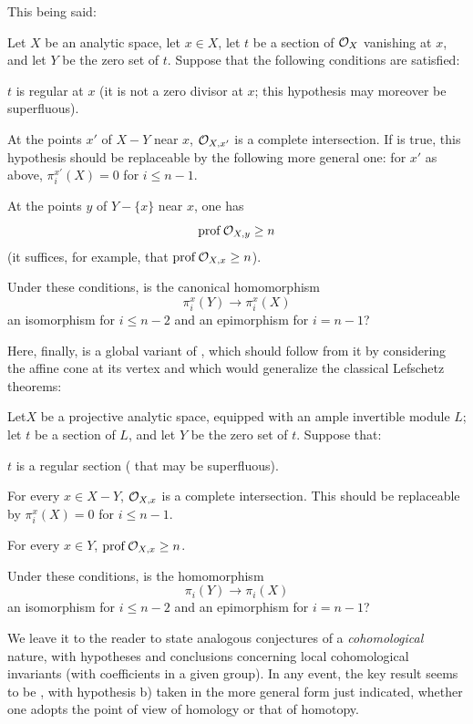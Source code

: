 This being said:

\begin{probleme} \label{XIII.4.2}
Let $X$ be an analytic space, let $x\in X$, let $t$ be a section of
$\mathcal O_X$ vanishing at $x$, and let $Y$ be the zero set of $t$. Suppose that
the following conditions are satisfied:
\begin{enumeratea}
\item
$t$ is regular at $x$ (\ie it is not a zero divisor at $x$; this
hypothesis may moreover be superfluous).
\item
At the points $x'$ of $X-Y$ near $x$, $\mathcal O_{X,x'}$ is a complete
intersection. If  is true, this hypothesis should be
replaceable by the following more general one: for $x'$ as above,
$\pi_i^{x'}(X)=0$ for $i\leq n-1$.
\item
At the points $y$ of $Y-\{x\}$ near $x$, one has
$$
\operatorname{prof}\mathcal O_{X,y}\geq n
$$
(it suffices, for example, that $\operatorname{prof}\mathcal O_{X,x}\geq n$).
\end{enumeratea}

Under these conditions, is the canonical homomorphism
$$
\pi_i^x(Y)\to\pi_i^x(X)
$$
an isomorphism for $i\leq n-2$ and an epimorphism for $i=n-1$?
\end{probleme}

Here, finally, is a global variant of , which should
follow from it by considering the affine cone at its vertex and
which would generalize the classical Lefschetz theorems:

\begin{probleme} \label{XIII.4.3}
Let\pageoriginale $X$ be a projective analytic space, equipped with an
ample invertible module $L$; let $t$ be a section of $L$, and let $Y$ be
the zero set of $t$. Suppose that:
\begin{enumeratea}
\item
$t$ is a regular section ( that may
be superfluous).
\item
For every $x\in X-Y$, $\mathcal O_{X,x}$ is a complete intersection. This
should be replaceable by $\pi_i^x(X)=0$ for $i\leq n-1$.
\item
For every $x\in Y$, $\operatorname{prof}\mathcal O_{X,x}\geq n$.
\end{enumeratea}

Under these conditions, is the homomorphism
$$
\pi_i(Y)\to\pi_i(X)
$$
an isomorphism for $i\leq n-2$ and an epimorphism for $i=n-1$?
\end{probleme}

We leave it to the reader to state analogous conjectures of a
\emph{cohomological} nature, with hypotheses and
conclusions concerning local cohomological invariants (with coefficients
in a given group). In any event, the key result seems to be
, with hypothesis b) taken in the more general form just
indicated, whether one adopts the point of view of homology or that of
homotopy.

